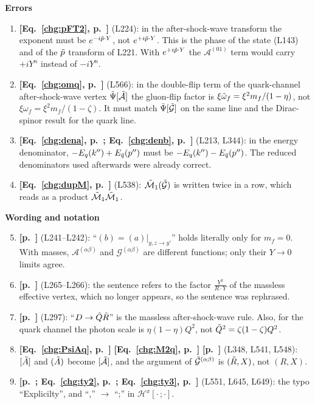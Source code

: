 \documentclass[9pt]{article}
\numberwithin{equation}{section}
\begin{document}
\noindent\textbf{Errors}
\begin{enumerate}
    \item \textbf{[Eq.~\eqref{chg:pFT2}, p.~\pageref{chg:pFT2}]} (L224): in the after-shock-wave transform the exponent must be $e^{-i\Tilde{p}\cdot Y}$, not $e^{+i\Tilde{p}\cdot Y}$. This is the phase of the state (L143) and of the $\Tilde{p}$ transform of L221. With $e^{+i\Tilde{p}\cdot Y}$ the $\mathcal{A}^{(01)}$ term would carry $+iY^{n}$ instead of $-iY^{n}$.
    \item \textbf{[Eq.~\eqref{chg:omq}, p.~\pageref{chg:omq}]} (L566): in the double-flip term of the quark-channel after-shock-wave vertex $\Tilde{\Psi}[\Tilde{\mathcal{A}}]$ the gluon-flip factor is $\xi\Tilde{\omega}_{f}=\xi^{2}m_{f}/(1-\eta)$, not $\xi\omega_{f}=\xi^{2}m_{f}/(1-\zeta)$. It must match $\Tilde{\Psi}[\Tilde{\mathcal{G}}]$ on the same line and the Dirac-spinor result for the quark line.
    \item \textbf{[Eq.~\eqref{chg:dena}, p.~\pageref{chg:dena}; Eq.~\eqref{chg:denb}, p.~\pageref{chg:denb}]} (L213, L344): in the energy denominator, $-E_{q}(k'')+E_{\Bar{q}}(p'')$ must be $-E_{q}(k'')-E_{\Bar{q}}(p'')$. The reduced denominators used afterwards were already correct.
    \item \textbf{[Eq.~\eqref{chg:dupM}, p.~\pageref{chg:dupM}]} (L538): $\Tilde{\mathcal{M}}_{1}(\Tilde{\mathcal{G}})$ is written twice in a row, which reads as a product $\Tilde{\mathcal{M}}_{1}\Tilde{\mathcal{M}}_{1}$.
\end{enumerate}
\noindent\textbf{Wording and notation}
\begin{enumerate}\setcounter{enumi}{4}
    \item \textbf{[p.~\pageref{chg:ba}]} (L241--L242): ``$(b)=(a)|_{y,z\rightarrow y'}$'' holds literally only for $m_{f}=0$. With masses, $\mathcal{A}^{(\alpha\beta)}$ and $\mathcal{G}^{(\alpha\beta)}$ are different functions; only their $Y\rightarrow0$ limits agree.
    \item \textbf{[p.~\pageref{chg:Y2RY}]} (L265--L266): the sentence refers to the factor $\frac{Y^{2}}{R\cdot Y}$ of the massless effective vertex, which no longer appears, so the sentence was rephrased.
    \item \textbf{[p.~\pageref{chg:Drule}]} (L297): ``$D\rightarrow\Tilde{Q}\Tilde{R}$'' is the massless after-shock-wave rule. Also, for the quark channel the photon scale is $\eta(1-\eta)Q^{2}$, not $\Tilde{Q}^{2}=\zeta(1-\zeta)Q^{2}$.
    \item \textbf{[Eq.~\eqref{chg:PsiAq}, p.~\pageref{chg:PsiAq}]} \textbf{[Eq.~\eqref{chg:M2q}, p.~\pageref{chg:M2q}]} \textbf{[p.~\pageref{chg:Gqarg}]} (L348, L541, L548): $[\Tilde{A}]$ and $(\Tilde{A})$ become $[\Tilde{\mathcal{A}}]$, and the argument of $\Tilde{\mathcal{G}}^{(\alpha\beta)}$ is $(\Tilde{R},X)$, not $(R,X)$.
    \item \textbf{[p.~\pageref{chg:ty}; Eq.~\eqref{chg:ty2}, p.~\pageref{chg:ty2}; Eq.~\eqref{chg:ty3}, p.~\pageref{chg:ty3}]} (L551, L645, L649): the typo ``Explicilty'', and ``,'' $\rightarrow$ ``;'' in $\mathcal{H}^{x}[\cdot\,;\cdot]$.
\end{enumerate}
\end{document}

